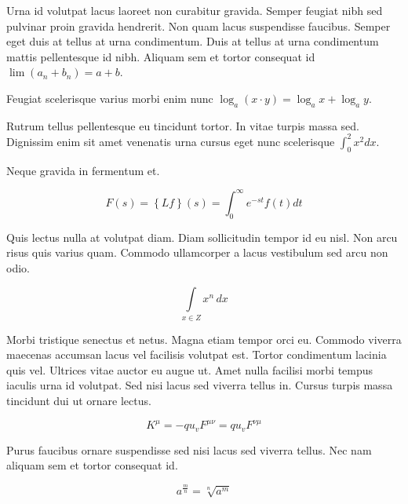 \documentclass{article}
\begin{document}
	
    Urna id volutpat lacus laoreet non curabitur gravida. Semper feugiat nibh sed pulvinar proin gravida hendrerit. Non quam lacus suspendisse faucibus. Semper eget duis at tellus at urna condimentum. Duis at tellus at urna condimentum mattis pellentesque id nibh. Aliquam sem et tortor consequat id 
    \begin{math}
    \lim\left ( a_n+b_n \right )=a+b
    \end{math}.
    \newline
    
    Feugiat scelerisque varius morbi enim nunc $ \log _{a}(x\cdot y)=\log _{a}x+\log _{a}y $.
    \newline
    
    Rutrum tellus pellentesque eu tincidunt tortor. In vitae turpis massa sed. Dignissim enim sit amet venenatis urna cursus eget nunc scelerisque \( \int_0^2x^2dx \).
    \newline
    
    Neque gravida in fermentum et. 
    
    \[ F\left ( s \right )=\left \{ Lf \right \}\left ( s \right )= \int_{0}^{\infty } e^{-st}f\left ( t \right ) dt  \]
    
    Quis lectus nulla at volutpat diam. Diam sollicitudin tempor id eu nisl. Non arcu risus quis varius quam. Commodo ullamcorper a lacus vestibulum sed arcu non odio.
    
    $$ \int\limits_{x\in Z}\! x^{n}\, dx $$
    
    Morbi tristique senectus et netus. Magna etiam tempor orci eu. Commodo viverra maecenas accumsan lacus vel facilisis volutpat est. Tortor condimentum lacinia quis vel. Ultrices vitae auctor eu augue ut. Amet nulla facilisi morbi tempus iaculis urna id volutpat. Sed nisi lacus sed viverra tellus in. Cursus turpis massa tincidunt dui ut ornare lectus.
    
    \begin{displaymath}
    	K^\mu =-qu_vF^{\mu \nu }=qu_vF^{\nu \mu }
    \end{displaymath}
    
    Purus faucibus ornare suspendisse sed nisi lacus sed viverra tellus. Nec nam aliquam sem et tortor consequat id.
    
    \begin{equation}
    a^{\frac{m}{n}}=\sqrt[n]{a^{m}}
    \end{equation}
    
\end{document}
